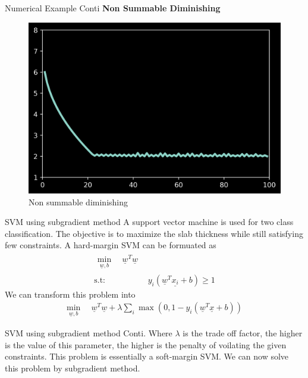 \documentclass{beamer}
\newcommand\twospace{\,\,}
\renewcommand{\vec}[1]{\underline{#1}}
\begin{document}
\begin{frame}{Numerical Example Conti}
    \textbf{Non Summable Diminishing}
    \begin{figure}[H]
        \centering
        \includegraphics[scale=0.5]{../../step/nonsummablediminishing.png}
        \caption{Non summable diminishing}
        \label{nonsummablediminishing}
    \end{figure}
\end{frame}


\begin{frame}{SVM using subgradient method}
A support vector machine is used for two class classification. The objective is to maximize the slab thickness while still satisfying  few constraints. A hard-margin SVM can be formuated as
\begin{align}
    \begin{split}
        \min_{\vec{w},b}\, &\twospace\vec{w}^T\vec{w}
    \end{split}\\ 
    \text{s.t:}
    \twospace & y_i(\vec{w}^T\vec{x_i}+b)\geq 1
\end{align}
\cite{10.1145/1273496.1273598}We can transform this problem into
\begin{align}
    \min_{\vec{w},b}\, &\twospace\vec{w}^T\vec{w} + \lambda \sum_i \max\left(0, 1-y_i\left(\vec{w}^T\vec{x}+b\right)\right)
\end{align}
\end{frame}

\begin{frame}{SVM using subgradient method Conti.}
    Where $\lambda$ is the trade off factor, the higher is the value of this parameter, the higher is the penalty of voilating the given constraints. This problem is essentially a soft-margin SVM. We can now solve this problem by subgradient method.
\end{frame}
\end{document}
